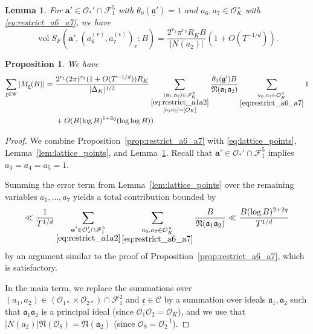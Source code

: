 \documentclass[10pt,a4paper]{amsart}
\newtheorem{prop}{Proposition}
\newtheorem{lemma}{Lemma}
\newcommand{\Cs}{\mathscr{C}}
\newcommand{\Fs}{\mathscr{F}}
\newcommand{\IK}{\Is_K}
\newcommand{\Is}{\mathscr{I}}
\newcommand\N{\mathfrak{N}}
\newcommand{\OK}{\Os_K}
\newcommand{\Os}{\mathcal{O}}
\newcommand\ab{\boldsymbol{a}}
\newcommand\afr{{\mathfrak{a}}}
\newcommand\afrb{{\underline{\mathfrak{a}}}}
\newcommand\cfrb{{\underline{\mathfrak{c}}}}
\newcommand\sums[1]{\sum_{\substack{#1}}}
\DeclareMathOperator{\vol}{vol}
\begin{document}
\begin{lemma}\label{lem:vol_S_F}
    For $\ab' \in \Os_*' \cap \Fs_1^5$ with $\theta_0(\afrb')=1$ and $a_6,a_7 \in \OK^\times$ with \eqref{eq:restrict_a6_a7}, we have
    \begin{equation*}
        \vol S_F(\ab',(a_6^{(v)},a_7^{(v)})_v;B) = \frac{2^{r_1}\pi^{r_2}R_K B}{|N(a_2)|} \left(1 + O(T^{-1/d})\right).
    \end{equation*}
\end{lemma}

\begin{prop}\label{prop:elements_to_ideals}
    We have
    \begin{equation*}
        \begin{aligned}
            \sum_{\cfrb \in \Cs} |M_\cfrb(B)| ={}& \frac{2^{r_1}(2\pi)^{r_2}(1 + O(T^{-1/d})) R_K}{|\Delta_K|^{1/2}} \sums{(\afr_1,\afr_2) \in \IK^2\\\eqref{eq:restrict_a1a2}\\        [\afr_1\afr_2]=[\OK]} \frac{\theta_0(\afrb')B}{\N(\afr_1\afr_2)} \sums{a_6,a_7 \in \OK^\times\\\eqref{eq:restrict_a6_a7}} 1\\
        &+ O(B(\log B)^{1+2q}(\log\log B))
        \end{aligned}
    \end{equation*}
\end{prop}

\begin{proof}
    We combine Proposition~\ref{prop:restrict_a6_a7} with \eqref{eq:lattice_points}, Lemma~\ref{lem:lattice_points}, and Lemma~\ref{lem:vol_S_F}. Recall that $\ab' \in \Os_*'\cap \Fs_1^5$ implies $a_3=a_4=a_5=1$.
    
    Summing the error term from Lemma~\ref{lem:lattice_points} over the remaining variables $a_1,\dots,a_7$ yields a total contribution bounded by
    \begin{equation*}
        \ll \frac{1}{T^{1/d}} \sums{\ab' \in \Os'_* \cap \Fs_1^5\\\eqref{eq:restrict_a1a2}} \sums{a_6,a_7 \in \OK^\times\\ \eqref{eq:restrict_a6_a7}} \frac{B}{\N(\afr_1\afr_2)} \ll \frac{B(\log B)^{2+2q}}{T^{1/d}}
    \end{equation*}
    by an argument similar to the proof of Proposition~\ref{prop:restrict_a6_a7}, which is satisfactory.
   
    In the main term, we replace the summations over $(a_1,a_2) \in (\Os_{1*}\times\Os_{2*})\cap \Fs_1^2$ and $\cfrb \in \Cs$ by a summation over ideals $\afr_1,\afr_2$ such that $\afr_1\afr_2$ is a principal ideal (since $\Os_1\Os_2 = \OK$), and we use that $|N(a_2)|\N(\Os_8) = \N(\afr_2)$ (since $\Os_8 = \Os_2^{-1}$).
\end{proof}
\end{document}
